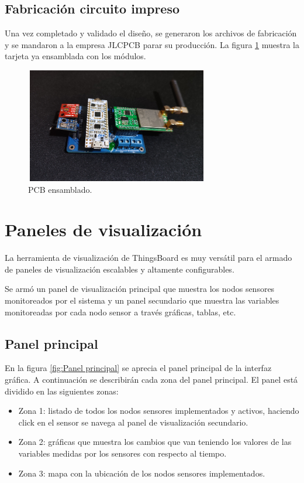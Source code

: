 \subsection{Fabricación circuito impreso} 
Una vez completado y validado el diseño, se generaron los archivos de fabricación y se mandaron a la empresa JLCPCB parar su producción. La figura \ref{fig:PCB ensamblado} muestra la tarjeta ya ensamblada con los módulos. 
\begin{figure}[h!]
  \centering
	\includegraphics[width=8cm, height=5cm]{./Figures/hardware_vistalateral.jpg}
  \caption{PCB ensamblado.}
	\label{fig:PCB ensamblado}
\end{figure}

\clearpage
\section{Paneles de visualización}
La herramienta de visualización de ThingsBoard es muy versátil para el armado de paneles de visualización escalables y altamente configurables.

Se armó un panel de visualización principal que muestra los nodos sensores monitoreados por el sistema y un panel secundario que muestra las variables monitoreadas por cada nodo sensor a través gráficas, tablas, etc.

\subsection{Panel principal} 

En la figura \ref{fig:Panel principal} se aprecia el panel principal de la interfaz gráfica. A continuación se describirán cada zona del panel principal.
El panel está dividido en las siguientes zonas:
\begin{itemize}
  \item Zona 1: listado de todos los nodos sensores implementados y activos, haciendo click en el sensor se navega al panel de visualización secundario.
  \item Zona 2: gráficas que muestra los cambios que van teniendo los valores de las variables medidas por los sensores con respecto al tiempo.
  \item Zona 3: mapa con la ubicación de los nodos sensores implementados.
\end{itemize}

